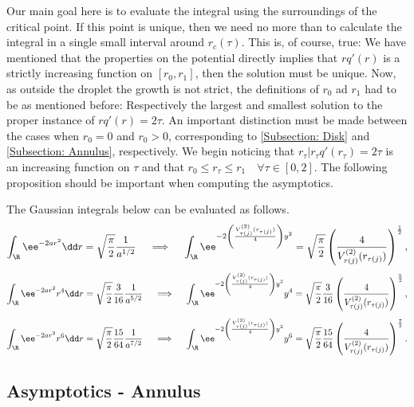 Our main goal here is to evaluate the integral using the surroundings of the critical point. If this point is unique, then we need no more than to calculate the integral in a single small interval around $r_c(\tau)$. This is, of course, true: We have mentioned that the properties on the potential directly implies that $r q'(r)$ is a strictly increasing function on $[r_0, r_1]$, then the solution must be unique. Now, as outside the droplet the growth is not strict, the definitions of $r_0$ ad $r_1$ had to be as mentioned before: Respectively the largest and smallest solution to the proper instance of $rq'(r) = 2\tau$. An important distinction must be made between the cases when $r_0 = 0$ and $r_0 > 0$, corresponding to \autoref{Subsection: Disk} and \autoref{Subsection: Annulus}, respectively.  We begin noticing that $r_\tau | r_\tau q'(r_\tau) = 2 \tau$ is an increasing function on $\tau$ and that $r_0 \leq r_\tau \leq r_1\quad \forall \tau \in [0,2]$. The following proposition should be important when computing the asymptotics.

	\begin{proposicao}
	The Gaussian integrals below can be evaluated as follows.
	\begin{equation}
		\int_{\R} \ee^{-2ar^2} \dd r = \sqrt{\frac{\pi}{2}} \frac{1}{a^{1/2}} \quad \implies \quad \int_{\R} \ee^{- 2 \left( \frac{V^{(2)}_{\tau(j)}(r_{\tau(j)})}{4} \right) y^2} = \sqrt{\frac{\pi}{2}} \left( \frac{4}{V^{(2)}_{\tau(j)}(r_{\tau(j)})} \right)^{\frac{1}{2}},
	\end{equation}
	\begin{equation}
		\int_{\R} \ee^{-2ar^2} r^4 \dd r = \sqrt{\frac{\pi}{2}} \frac{3}{16} \frac{1}{a^{5/2}} \quad \implies \quad \int_{\R} \ee^{- 2 \left( \frac{V^{(2)}_{\tau(j)}(r_{\tau(j)})}{4} \right) y^2} y^4 = \sqrt{\frac{\pi}{2}} \frac{3}{16} \left(\frac{4}{V^{(2)}_{\tau(j)}(r_{\tau(j)})} \right)^{\frac{5}{2}},
	\end{equation}
	\begin{equation}
		\int_{\R} \ee^{-2ar^2} r^6 \dd r = \sqrt{\frac{\pi}{2}} \frac{15}{64} \frac{1}{a^{7/2}} \quad \implies \quad \int_{\R}\ee^{- 2 \left( \frac{V^{(2)}_{\tau(j)}(r_{\tau(j)})}{4} \right) y^2} y^6 = \sqrt{\frac{\pi}{2}} \frac{15}{64} \left( \frac{4}{V^{(2)}_{\tau(j)}(r_{\tau(j)})} \right)^{\frac{7}{2}}.
	\end{equation}
	\label{Prop: Gaussian integrals}
\end{proposicao}

\subsection{Asymptotics - Annulus}
\label{Subsection: Annulus}

